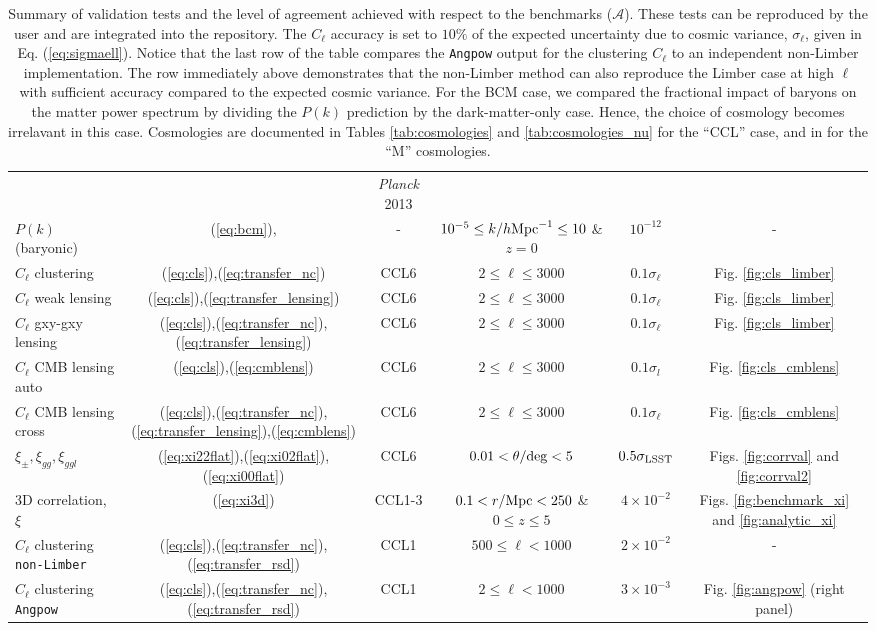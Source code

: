 \begin{sidewaystable*}[!htp]
\begin{tabular}{ l|c c c c c}
     &  & {\it Planck} 2013 &  & \\
    $P(k)$ (baryonic) & (\ref{eq:bcm}), \citet{Schneider15} &  - & $10^{-5}\leq k/h{\rm Mpc}^{-1}\leq 10$ \& $z=0$ & $10^{-12}$ & -\\
    $C_\ell$ clustering & (\ref{eq:cls}),(\ref{eq:transfer_nc})& CCL6 &$2 \leq \ell\leq 3000$ &  $0.1\sigma_\ell$  & Fig. \ref{fig:cls_limber}\\
    $C_\ell$ weak lensing & (\ref{eq:cls}),(\ref{eq:transfer_lensing})& CCL6 &$2 \leq \ell\leq 3000$ &  $0.1\sigma_\ell$  & Fig. \ref{fig:cls_limber}\\
    $C_\ell$ gxy-gxy lensing & (\ref{eq:cls}),(\ref{eq:transfer_nc}),(\ref{eq:transfer_lensing})& CCL6 &$2 \leq \ell\leq 3000$ &  $0.1\sigma_\ell$ & Fig. \ref{fig:cls_limber}\\
    $C_\ell$ CMB lensing auto &(\ref{eq:cls}),(\ref{eq:cmblens}) & CCL6 & $2 \leq \ell\leq 3000$& $0.1\sigma_l$  & Fig. \ref{fig:cls_cmblens}\\
    $C_\ell$ CMB lensing cross &(\ref{eq:cls}),(\ref{eq:transfer_nc}),(\ref{eq:transfer_lensing}),(\ref{eq:cmblens}) & CCL6 & $2 \leq \ell\leq 3000$& $0.1\sigma_\ell$  & Fig. \ref{fig:cls_cmblens}\\
    $\xi_{\pm},\xi_{gg},\xi_{ggl}$ & (\ref{eq:xi22flat}),(\ref{eq:xi02flat}),(\ref{eq:xi00flat}) & CCL6 & $0.01< \theta/{\rm deg}< 5$&  $0.5\sigma_{\rm LSST}$ & Figs. \ref{fig:corrval} and \ref{fig:corrval2}\\
    3D correlation, $\xi$ & (\ref{eq:xi3d}) & CCL1-3 & $0.1<r/{\rm Mpc}<250$ \& $0 \leq z \leq 5$& $4\times 10^{-2}$ & Figs. \ref{fig:benchmark_xi} and \ref{fig:analytic_xi} \\
    $C_\ell$ clustering {\tt non-Limber} &  (\ref{eq:cls}),(\ref{eq:transfer_nc}),(\ref{eq:transfer_rsd}) & CCL1 & $500 \leq \ell < 1000$ & $2\times 10^{-2}$ & - \\
    $C_\ell$ clustering {\tt Angpow} & (\ref{eq:cls}),(\ref{eq:transfer_nc}),(\ref{eq:transfer_rsd}) & CCL1 & $2 \leq \ell < 1000$ & $3\times 10^{-3}$  & Fig. \ref{fig:angpow} (right panel)\\
    \hline
  \end{tabular}
  \caption{Summary of \ccl validation tests and the level of agreement achieved with respect to the benchmarks ($\mathcal{A}$). These tests can be reproduced by the user and are integrated into the \ccl repository. The $C_\ell$ accuracy is set to $10\%$ of the expected uncertainty due to cosmic variance, $\sigma_\ell$, given in Eq. (\ref{eq:sigmaell}). Notice that the last row of the table compares the {\tt Angpow} output for the clustering $C_\ell$ to an independent non-Limber implementation. The row immediately above demonstrates that the non-Limber method can also reproduce the Limber case at high $\ell$ with sufficient accuracy compared to the expected cosmic variance. For the BCM case, we compared the fractional impact of baryons on the matter power spectrum by dividing the $P(k)$ prediction by the dark-matter-only case. Hence, the choice of cosmology becomes irrelavant in this case. Cosmologies are documented in Tables \ref{tab:cosmologies} and \ref{tab:cosmologies_nu} for the ``CCL'' case, and in \citet{Lawrence17} for the ``M'' cosmologies.}
  \label{tab:tests}
\end{sidewaystable*}
